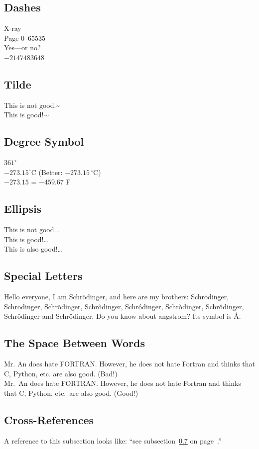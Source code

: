 \documentclass[a4paper,10pt]{article}
\begin{document}
    \subsection{Dashes}
    X-ray\\
    Page 0--65535\\
    Yes---or no?\\
    $-2147483648$
    \subsection{Tilde}
    This is not good.\~{}\\
    This is good!$\sim$
    \subsection{Degree Symbol}
    $361^{\circ}$\\
    $-273.15^{\circ}\mathrm{C}$ (Better: $-273.15\,^{\circ}\mathrm{C}$)\\
    $-273.15$ \textcelsius{} = $-459.67$ \textdegree{}F
    \subsection{Ellipsis}
    This is not good...\\
    This is good!\dots{}\\
    This is also good!\ldots{}
    \subsection{Special Letters}
    Hello everyone, I am Schr\"{o}dinger, and here are my brothers:
    Schr\.{o}dinger, Schr\={o}dinger, Schr\~{o}dinger,
    Schr\^{o}dinger, Schr\'{o}dinger, Schr\`{o}dinger,
    Schr\u{o}dinger, Schr\v{o}dinger and Schr\H{o}dinger.
    Do you know about angstrom? Its symbol is \AA{}.
    \subsection{The Space Between Words}
    Mr. An does hate FORTRAN. However, he does not hate Fortran and thinks that C, Python, etc. are also good. (Bad!)\\
    Mr.~An does hate FORTRAN\@. However, he does not hate Fortran and thinks that C, Python, etc.\ are also good. (Good!)
    \subsection{Cross-References}\label{ref}
    A reference to this subsection looks like:
    ``see subsection~\ref{ref} on page~\pageref{ref}.''
\end{document}
